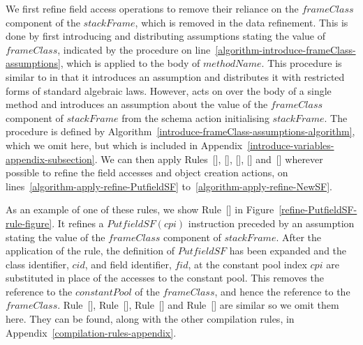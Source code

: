 We first refine field access operations to remove their reliance on
the $frameClass$ component of the $stackFrame$, which is removed in
the data refinement.
This is done by first introducing and distributing assumptions stating
the value of $frameClass$, indicated by the procedure
 on
line~\ref{algorithm-introduce-frameClass-assumptions}, which is
applied to the body of $methodName$.
This procedure is similar to 
in that it introduces an assumption and distributes it with restricted
forms of standard algebraic laws.
However,  acts on over the body
of a single method and introduces an assumption about the value of the
$frameClass$ component of $stackFrame$ from the schema action
initialising $stackFrame$.
The  procedure is defined by
Algorithm~\ref{introduce-frameClass-assumptions-algorithm}, which we
omit here, but which is included in
Appendix~\ref{introduce-variables-appendix-subsection}.
We can then apply Rules~[],
[],
[],
[] and~[]
wherever possible to refine the field accesses and object creation
actions, on lines~\ref{algorithm-apply-refine-PutfieldSF}
to~\ref{algorithm-apply-refine-NewSF}.

As an example of one of these rules, we show
Rule~[] in
Figure~\ref{refine-PutfieldSF-rule-figure}.
It refines a $PutfieldSF(cpi)$ instruction preceded by an assumption
stating the value of the $frameClass$ component of $stackFrame$.
After the application of the rule, the definition of $PutfieldSF$ has
been expanded and the class identifier, $cid$, and field identifier,
$fid$, at the constant pool index $cpi$ are substituted in place of
the accesses to the constant pool.
This removes the reference to the $constantPool$ of the $frameClass$,
and hence the reference to the $frameClass$.
Rule~[],
Rule~[],
Rule~[] and
Rule~[] are similar so we omit them here.
They can be found, along with the other compilation rules, in
Appendix~\ref{compilation-rules-appendix}.

